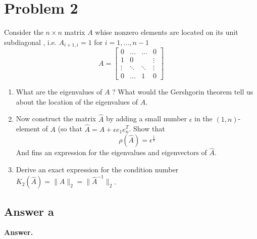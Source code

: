 \documentclass{article}
\theoremstyle{remark}
\begin{document}
\newpage

\section{Problem 2}%
\label{sec:problem_2}

Consider the $n \times n $ matrix $A$ whise nonzero elements are located on its unit subdiagonal , i.e. $A_{i+1, i} = 1$ for $i = 1, \ldots, n-1$\[
A = \begin{bmatrix} 
  0  &  \ldots  &  \ldots  & 0 \\
  1  &  0  &    & \vdots  \\
  \vdots   & \ddots   & \ddots   &  \vdots   \\
  0  &  \ldots     & 1  & 0 
\end{bmatrix} 
\] 

\begin{enumerate}[label=(\alph*)]
  \item  What are the eigenvalues of $A$ ? What would the Gershgorin theorem tell us about the location of the eigenvalues of $A$.
  \item  Now construct the matrix $\hat{A}$ by adding a small number $\epsilon $ in the $\left( 1, n \right)$- element of $A$ (so that $\hat{A} = A  +  \epsilon e_{1} e_{n}^{T} $. Show that \[
      \rho \left( \hat{A} \right) = \epsilon ^{\frac{1}{n} }
  \] 
  And fins an expression for the eigenvalues and eigenvectors of $\hat{A}$. 
\item Derive an exact expression for the condition number $K_{2} \left( \hat{A} \right) =  \|\hat{A}\|_{2}^{} = \|\hat{A}^{-1}\|_{2}^{}$.

  \end{enumerate}

  \subsection{Answer a}%
  \label{sub:answer_a}
  
      \textbf{Answer.} 
\end{document}
